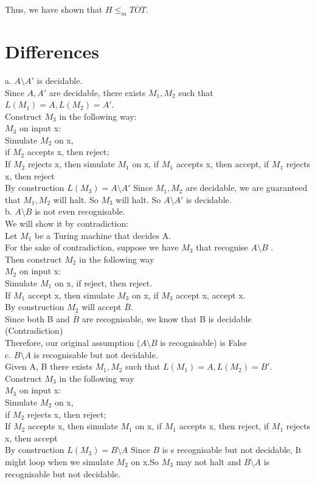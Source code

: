 \documentclass[12pt]{article}
\begin{document}
Thus, we have shown that $H \le_m \overline{TOT}$.




\pagebreak
\section{Differences}

a.  $A\setminus A'$ is decidable.\\
Since $A, A'$ are decidable, there exists $M_1, M_2$ such that $L(M_1) = A, L(M_2) = A'$.\\
Construct $M_3$ in the following way:\\
$M_3$ on input x:\\
Simulate $M_2$ on x, \\
if $M_2$ accepts x, then reject;\\
If $M_2$ rejects x, then simulate $M_1$ on x, if $M_1$ accepts x, then accept,  if $M_1$ rejects x, then reject\\

By construction $L(M_3) = A\setminus A'$
Since $M_1, M_2$ are decidable, we are guaranteed that $M_1, M_2$ will halt. So $M_3$ will halt. So $A\setminus A'$ is decidable.\\

b.
$A\setminus B$  is not even recognisable.\\
We will show it by contradiction:\\
Let $M_1$ be a Turing machine that decides A.\\ 
For the sake of contradiction, suppose we have $M_3$ that recognise $A\setminus B$ .\\
Then construct $M_2$ in the following way\\
$M_2$ on input x:\\
Simulate $M_1$ on x, if reject, then reject.\\
If $M_1$ accept x, then simulate $M_3$ on x, if $M_3$ accept x, accept x.\\
By construction $M_2$ will accept $\overline B$.\\

Since both B and $\overline{B}$ are recognisable, we know that B is decidable (Contradiction)\\
Therefore, our original assumption ($A\setminus B$  is recognisable) is False\\

c.  $B\setminus A$ is recognisable but not decidable.\\
Given A, B there exists $M_1, M_2$ such that $L(M_1) = A, L(M_2) = B'$.\\
Construct $M_3$ in the following way\\
$M_3$ on input x:\\
Simulate $M_2$ on x, \\
if $M_2$ rejects x, then reject;\\
If $M_2$ accepts x, then simulate $M_1$ on x, if $M_1$ accepts x, then reject,  if $M_1$ rejects x, then accept\\

By construction $L(M_3) = B\setminus A$
Since $B$ is s recognisable but not decidable, It might loop when we simulate $M_2$ on x.So $M_3$ may not halt and $ B\setminus A$ is recognisable but not decidable.\\
\end{document}
